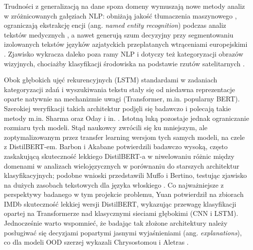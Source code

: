 \documentclass[runningheads]{llncs}
\begin{document}
Trudności z generalizacją na dane spoza domeny wymuszają nowe metody analiz w zróżnicowanych gałęziach NLP: obniżają jakość tłumaczenia maszynowego \cite{haddow-koehn-2012-analysing}, ograniczają ekstrakcję encji (ang. \textit{named entity recognition}) podczas analiz tekstów medycznych \cite{9648338}, a nawet generują szum decyzyjny przy segmentowaniu izolowanych tekstów języków azjatyckich przeplatanych wtrąceniami europejskimi \cite{Limkonchotiwat2021HandlingCA}. Zjawisko wykracza daleko poza ramy NLP i dotyczy też kategoryzacji obrazów wizyjnych, chociażby klasyfikacji środowiska na podstawie rzutów satelitarnych \cite{Kolodner2022EvaluatingDL}.

Obok głębokich ujęć rekurencyjnych (LSTM) standardami w zadaniach kategoryzacji zdań i wyszukiwania tekstu stały się od niedawna reprezentacje oparte natywnie na mechanizmie uwagi (Transformer, m.in. popularny BERT). Szerokiej weryfikacji takich architektur podjęli się badawczo i polecają takie metody m.in. Sharma \cite{Sharma2025ACA} oraz Oday i in. \cite{Oday2025TextCF}. Istotną luką pozostaje jednak ograniczanie rozmiaru tych modeli. Stąd naukowcy zwrócili się ku mniejszym, ale zoptymalizowanym przez transfer learning wersjom tych samych modeli, na czele z DistilBERT-em. Barbon i Akabane \cite{s22218184} potwierdzili badawczo wysoką, często zaskakującą skuteczność lekkiego DistilBERT-a w niwelowaniu różnic między domenami w analizach wielojęzycznych w porównaniu do starszych architektur klasyfikacyjnych; podobne wnioski przedstawili Muffo i Bertino, testując zjawisko na dużych zasobach tekstowych dla języka włoskiego \cite{muffo2023bertinoitaliandistilbertmodel}. Co najważniejsze z perspektywy badanego w tym projekcie problemu, Yuan \cite{Yuan2026EmpiricalSO} potwierdził na zbiorach IMDb skuteczność lekkiej wersji DistilBERT, wykazując przewagę klasyfikacji opartej na Transformerze nad klasycznymi sieciami głębokimi (CNN i LSTM). Jednocześnie warto wspomnieć, że badając tak złożone architektury należy posługiwać się decyzjami popartymi jasnymi wyjaśnieniami (ang. \textit{explanations}), co dla modeli OOD szerzej wykazali Chrysostomou i Aletras \cite{chrysostomou2022empiricalstudyexplanationsoutofdomain}.
\end{document}

